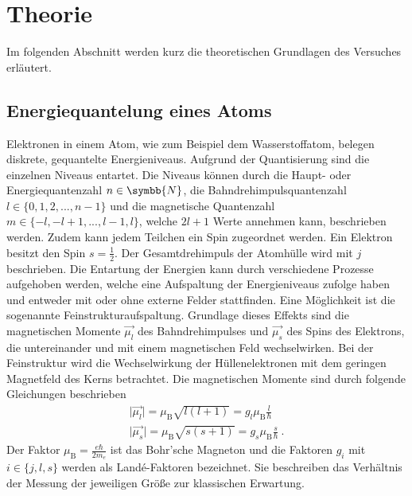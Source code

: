 \section{Theorie}
\label{sec:theorie}

    Im folgenden Abschnitt werden kurz die theoretischen Grundlagen des Versuches erläutert.

\subsection{Energiequantelung eines Atoms}

    Elektronen in einem Atom,
    wie zum Beispiel dem Wasserstoffatom,
    belegen diskrete, gequantelte Energieniveaus.
    Aufgrund der Quantisierung sind die einzelnen Niveaus entartet. %
    Die Niveaus können durch die Haupt- oder Energiequantenzahl $n \in \symbb{N}$,
    die Bahndrehimpulsquantenzahl $l \in \{0, 1, 2, ... , n-1\}$ und die magnetische Quantenzahl $m \in \{-l, -l+1, ..., l-1, l\}$,
    welche $2l + 1$ Werte annehmen kann,
    beschrieben werden.
    Zudem kann jedem Teilchen ein Spin zugeordnet werden.
    Ein Elektron besitzt den Spin $s = \frac{1}{2}$.
    Der Gesamtdrehimpuls der Atomhülle wird mit $j$ beschrieben.
    Die Entartung der Energien kann durch verschiedene Prozesse aufgehoben werden,
    welche eine Aufspaltung der Energieniveaus zufolge haben und entweder mit oder ohne externe Felder stattfinden.
    Eine Möglichkeit ist die sogenannte Feinstrukturaufspaltung.
    Grundlage dieses Effekts sind die magnetischen Momente $\vec{\mu_l}$ des Bahndrehimpulses und $\vec{\mu_s}$ des Spins des Elektrons,
    die untereinander und mit einem magnetischen Feld wechselwirken.
    Bei der Feinstruktur wird die Wechselwirkung der Hüllenelektronen mit dem geringen Magnetfeld des Kerns betrachtet.
    Die magnetischen Momente sind durch folgende Gleichungen beschrieben
    \begin{gather}
        \lvert \vec{\mu_l} \rvert = \mu_\text{B} \sqrt{l(l+1)} = g_l \mu_\text{B} \frac{l}{\hbar}
        \label{eqn:magn_mom_l} \\
        \lvert \vec{\mu_s} \rvert = \mu_\text{B} \sqrt{s(s+1)} = g_s \mu_\text{B} \frac{s}{\hbar} \ .
        \label{eqn:magn_mom_s}
    \end{gather}
    Der Faktor $\mu_\text{B} = \frac{e \hbar}{2 m_{e}}$ ist das Bohr'sche Magneton und die Faktoren $g_{i}$ mit $i \in \{j,l,s\}$ werden als Landé-Faktoren bezeichnet.
    Sie beschreiben das Verhältnis der Messung der jeweiligen Größe zur klassischen Erwartung.
